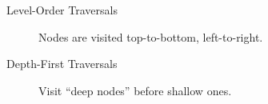 \begin{description}
\item[Level-Order Traversals] Nodes are visited top-to-bottom, left-to-right.
\item[Depth-First Traversals] Visit ``deep nodes'' before shallow ones.
\end{description}
